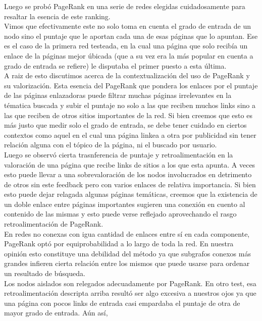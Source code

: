 Luego se probó PageRank en una serie de redes elegidas cuidadosamente para resaltar la esencia de este ranking. \\
Vimos que efectivamente este no solo toma en cuenta el grado de entrada de un nodo sino el puntaje que le aportan cada una de esas páginas que lo apuntan. Ese es el caso de la primera red testeada, en la cual una página que solo recibía un enlace de la páginas mejor úbicada (que a su vez era la más popular en cuenta a grado de entrada se refiere) le disputaba el primer puesto a esta última.\\
A raiz de esto discutimos acerca de la contextualización del uso de PageRank y su valorización. Esta esencia del PageRank que pondera los enlaces por el puntaje de las páginas enlazadoras puede filtrar muchas páginas irrelevantes en la tématica buscada y subir el puntaje no solo a las que reciben muchos links sino a las que reciben de otros sitios importantes de la red. Si bien creemos que esto es más justo que medir solo el grado de entrada, se debe tener cuidado en ciertos contextos como aquel en el cual una página linkea a otra por publicidad sin tener relación alguna con el tópico de la página, ni el buscado por usuario. \\

Luego se observó cierta trasnferencia de puntaje y retroalimentación en la valoración de una página que recibe links de sitios a los que esta apunta. A veces esto puede llevar a una sobrevaloración de los nodos involucrados en detrimento de otros sin este feedback pero con varios enlaces de relativa importancia. Si bien esto puede dejar relagada algunas páginas temáticas, creemos que la existencia de un doble enlace entre páginas importantes sugieren una conexión en cuento al contenido de las mismas y esto puede verse reflejado aprovechando el rasgo retroalimentación de PageRank. \\

En redes no conexas con igua cantidad de enlaces entre sí en cada componente, PageRank optó por equiprobabilidad a lo largo de toda la red. En nuestra opinión esto constituye una debilidad del método ya que subgrafos conexos más grandes infieren cierta relación entre los mismos que puede usarse para ordenar un resultado de búsqueda. \\

Los nodos aislados son relegados adecuadamente por PageRank. En otro test, esa retroalimentación descripta arriba resultó ser algo excesiva a nuestros ojos ya que una página con pocos links de entrada casi empardaba el puntaje de otra de mayor grado de entrada. Aún así, \\

